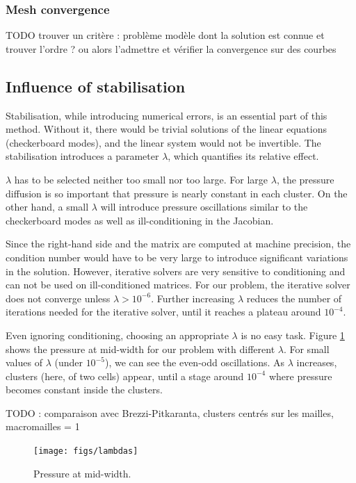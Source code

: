 \documentclass[12pt]{article}
\begin{document}
\subsubsection{Mesh convergence}
TODO trouver un crit\`ere : probl\`eme mod\`ele dont la solution est connue
et trouver l'ordre ? ou alors l'admettre et v\'erifier la convergence
sur des courbes
\subsection{Influence of stabilisation}
Stabilisation, while introducing numerical errors, is an essential
part of this method. Without it, there would be trivial solutions of
the linear equations (checkerboard modes), and the linear system would
not be invertible. The stabilisation introduces a parameter $\lambda$,
which quantifies its relative effect.

$\lambda$ has to be selected neither too small nor too large. For
large $\lambda$, the pressure diffusion is so important that pressure
is nearly constant in each cluster. On the other hand, a small
$\lambda$ will introduce pressure oscillations similar to the
checkerboard modes as well as ill-conditioning in the Jacobian.

Since the right-hand side and the matrix are computed at machine
precision, the condition number would have to be very large to
introduce significant variations in the solution. However, iterative
solvers are very sensitive to conditioning and can not be used on
ill-conditioned matrices. For our problem, the iterative solver does
not converge unless $\lambda > 10^{-6}$. Further increasing $\lambda$
reduces the number of iterations needed for the iterative solver,
until it reaches a plateau around $10^{-4}$.

Even ignoring conditioning, choosing an appropriate $\lambda$ is no
easy task. Figure \ref{fig:lambdas} shows the pressure at mid-width
for our problem with different $\lambda$. For small values of
$\lambda$ (under $10^{-5}$), we can see the even-odd oscillations. As
$\lambda$ increases, clusters (here, of two cells) appear, until a
stage around $10^{-4}$ where pressure becomes constant inside the
clusters.

TODO : comparaison avec Brezzi-Pitkaranta, clusters centrés sur les
mailles, macromailles = 1
\begin{figure}[htb]
\centering
\texttt{[image: figs/lambdas]}
\caption{Pressure at mid-width.}
\label{fig:lambdas}
\end{figure}
\end{document}
